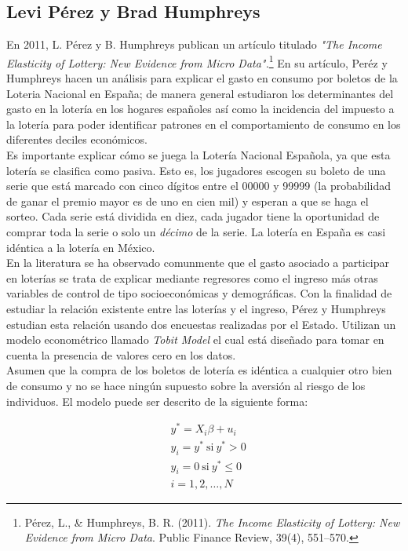 \subsection{Levi Pérez y Brad Humphreys} 

En 2011, L. Pérez y B. Humphreys publican un artículo titulado \textit{"The Income Elasticity of Lottery: New Evidence from Micro Data".}\footnote{Pérez, L., \& Humphreys, B. R. (2011). \textit{The Income Elasticity of Lottery: New Evidence from Micro Data}. Public Finance Review, 39(4), 551–570.} En su artículo, Peréz y Humphreys hacen un análisis para explicar el gasto en consumo por boletos de la Loteria Nacional en España; de manera general estudiaron los determinantes del gasto en la lotería en los hogares españoles así como la incidencia del impuesto a la lotería para poder identificar patrones en el comportamiento de consumo en los diferentes deciles económicos. \\

Es importante explicar cómo se juega la Lotería Nacional Española, ya que esta lotería se clasifica como pasiva. Esto es, los jugadores escogen su boleto de una serie que está marcado con cinco dígitos entre el 00000 y 99999 (la probabilidad de ganar el premio mayor es de uno en cien mil) y esperan a que se haga el sorteo. Cada serie está dividida en diez, cada jugador tiene la oportunidad de comprar toda la serie o solo un \textit{décimo} de la serie. La lotería en España es casi idéntica a la lotería en México. \\

En la literatura se ha observado comunmente que el gasto asociado a participar en loterías se trata de explicar mediante regresores como el ingreso más otras variables de control de tipo socioeconómicas y demográficas. Con la finalidad de estudiar la relación existente entre las loterías y el ingreso, Pérez y Humphreys estudian esta relación usando dos encuestas realizadas por el Estado. Utilizan un modelo econométrico llamado \textit{Tobit Model} el cual está diseñado para tomar en cuenta la presencia de valores cero en los datos. \\

Asumen que la compra de los boletos de lotería es idéntica a cualquier otro bien de consumo y no se hace ningún supuesto sobre la aversión al riesgo de los individuos. El modelo puede ser descrito de la siguiente forma: 

\begin{align*}
    & y^* = X_i \beta + u_i \\
    & y_i = y^* \ \text{si} \ y^* >0 \\
    & y_i = 0 \ \text{si} \ y^* \leq 0 \\
    & i = 1,2,\dots, N
\end{align*}

